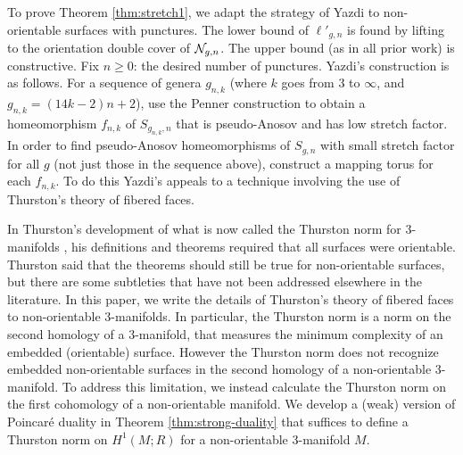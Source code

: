 

 To prove Theorem \ref{thm:stretch1}, we adapt the strategy of Yazdi \cite{yazdi2018pseudo} to non-orientable surfaces with punctures.  The lower bound of $\ell'_{g,n}$ is found by lifting to the orientation double cover of $\mathcal{N}_{g,n}$.  The upper bound (as in all prior work) is constructive.  Fix $n\geq 0$: the desired number of punctures.  Yazdi's construction is as follows.  For a sequence of genera $g_{n,k}$ (where $k$ goes from $3$ to $\infty$, and $g_{n,k} = (14k-2)n + 2$), use the Penner construction \cite{penner1988construction} to obtain a homeomorphism $f_{n,k}$ of $S_{g_{n,k},n}$ that is pseudo-Anosov and has low stretch factor.  In order to find pseudo-Anosov homeomorphisms of $S_{g,n}$ with small stretch factor for all $g$ (not just those in the sequence above), construct a mapping torus for each $f_{n,k}$.  To do this Yazdi's appeals to a technique involving the use of Thurston's theory of fibered faces.  %

 In Thurston's development of what is now called the Thurston norm for 3-manifolds \cite{thurston1986norm}, his definitions and theorems required that all surfaces were orientable.  Thurston said that the theorems should still be true for non-orientable surfaces, but there are some subtleties that have not been addressed elsewhere in the literature.  In this paper, we write the details of Thurston's theory of fibered faces to non-orientable 3-manifolds.  In particular, the Thurston norm is a norm on the second homology of a 3-manifold, that measures the minimum complexity of an embedded (orientable) surface. However the Thurston norm does not recognize embedded non-orientable surfaces in the second homology of a non-orientable 3-manifold.  To address this limitation, we instead calculate the Thurston norm on the first cohomology of a non-orientable manifold.  We develop a (weak) version of Poincar\'e duality in Theorem \ref{thm:strong-duality} that suffices to define a Thurston norm on $H^1(M;R)$ for a non-orientable 3-manifold $M$.

